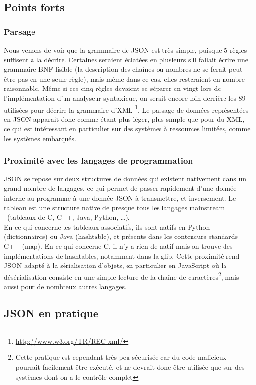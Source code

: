 \documentclass[a4paper,11pt]{article}
\begin{document}
\subsection{Points forts}

\subsubsection{Parsage}
Nous venons de voir que la grammaire de JSON est très simple, puisque 5 règles suffisent à la décrire. Certaines seraient éclatées en plusieurs s'il fallait écrire une grammaire BNF lisible (la description des chaînes ou nombres ne se ferait peut-être pas en une seule règle), mais même dans ce cas, elles resteraient en nombre raisonnable. Même si ces cinq règles devaient se séparer en vingt lors de l'implémentation d'un analyseur syntaxique, on serait encore loin derrière les 89 utilisées pour décrire la grammaire d'XML \footnote{\url{http://www.w3.org/TR/REC-xml/}}.
Le parsage de données représentées en JSON apparaît donc comme étant plus léger, plus simple que pour du XML, ce qui est intéressant en particulier sur des systèmes à ressources limitées, comme les systèmes embarqués.

\subsubsection{Proximité avec les langages de programmation}
JSON se repose sur deux structures de données qui existent nativement dans un grand nombre de langages, ce qui permet de passer rapidement d'une donnée interne au programme à une donnée JSON à transmettre, et inversement. Le tableau est une structure native de presque tous les langages \og mainstream \fg~(tableaux de C, C++, Java, Python, \ldots).\\
En ce qui concerne les tableaux associatifs, ils sont natifs en Python (dictionnaires) ou Java (hashtable), et présents dans les conteneurs standards C++ (map). En ce qui concerne C, il n'y a rien de natif mais on trouve des implémentations de hashtables, notamment dans la glib. Cette proximité rend JSON adapté à la sérialisation d'objets, en particulier en JavaScript où la désérialisation consiste en une simple lecture de la chaîne de caractères\footnote{Cette pratique est cependant très peu sécurisée car du code malicieux pourrait facilement être exécuté, et ne devrait donc être utilisée que sur des systèmes dont on a le contrôle complet}, mais aussi pour de nombreux autres langages.


\subsection{JSON en pratique}
\end{document}
